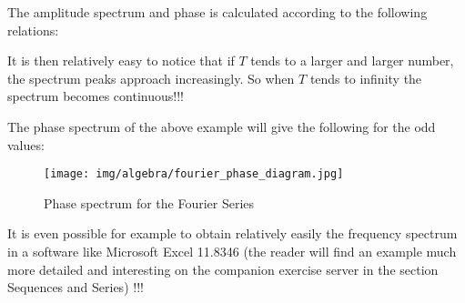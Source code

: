 	The amplitude spectrum and phase is calculated according to the following relations:
	
	It is then relatively easy to notice that if $T$ tends to a larger and larger number, the spectrum peaks approach increasingly. So when $T$ tends to infinity the spectrum becomes continuous!!!
	
	The phase spectrum of the above example will give the following for the odd values:
	\begin{figure}[H]
		\centering
		\texttt{[image: img/algebra/fourier\_phase\_diagram.jpg]}
		\caption[]{Phase spectrum for the Fourier Series}
	\end{figure}
	It is even possible for example to obtain relatively easily the frequency spectrum in a software like Microsoft Excel 11.8346 (the reader will find an example much more detailed and interesting on the companion exercise server in the section Sequences and Series) !!!
	
